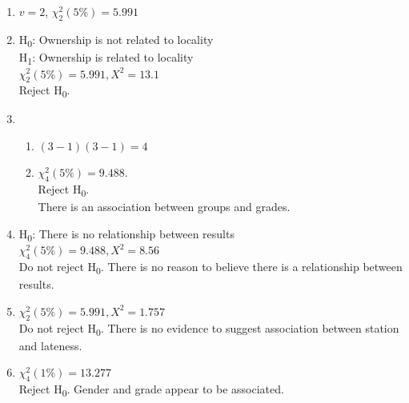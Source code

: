 \documentclass[fleqn]{article}
\begin{document}
\newpage
{}
\begin{enumerate}
    \setlength\itemsep{0.5em}
    \item $v=2$, $\chi_2^2(5\%)=5.991$
    
    \item H\textsubscript{0}: Ownership is not related to locality \\
        H\textsubscript{1}: Ownership is related to locality \\
        $\chi_2^2(5\%)=5.991, X^2=13.1$ \\
        Reject H\textsubscript{0}.
        
    \item \begin{enumerate}[label=\bfseries \alph*\space ]
            \item $(3-1)(3-1)=4$
            \item $\chi_4^2(5\%)=9.488$. \\
                Reject H\textsubscript{0}. \\
                There is an association between groups and grades.
        \end{enumerate}
        
    \item H\textsubscript{0}: There is no relationship between results \\
        $\chi_4^2(5\%)=9.488, X^2=8.56$ \\
        Do not reject H\textsubscript{0}. There is no reason to believe there is a relationship between results.
        
    \item $\chi_2^2(5\%)=5.991, X^2=1.757$ \\
        Do not reject H\textsubscript{0}. There is no evidence to suggest association between station and lateness.
        
    \item $\chi_4^2(1\%)=13.277$ \\
        Reject H\textsubscript{0}. Gender and grade appear to be associated.
        

\end{enumerate}
\end{document}
